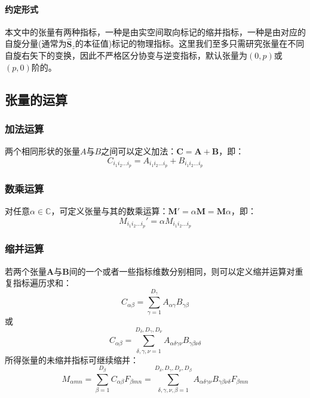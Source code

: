 \paragraph{约定形式}
本文中的张量有两种指标，一种是由实空间取向标记的缩并指标，一种是由对应的自旋分量(通常为$\hat{\symbf{S}}_z$的本征值)标记的物理指标。这里我们至多只需研究张量在不同自旋右矢下的变换，因此不严格区分协变与逆变指标，默认张量为$(0,p)$或$(p,0)$阶的。

\subsection{张量的运算}

\subsubsection{加法运算}

两个相同形状的张量$A$与$B$之间可以定义加法：$\symbf{C} = \symbf{A}+\symbf{B}$，即：
\begin{equation}
C_{i_1 i_2 \dots i_p} = A_{i_1 i_2 \dots i_p} + B_{i_1 i_2 \dots i_p}
\end{equation}


\subsubsection{数乘运算}

对任意$\alpha \in \mathbb{C}$，可定义张量与其的数乘运算：$\symbf{M}' = \alpha \symbf{M} = \symbf{M} \alpha$，即：
\begin{equation}
M_{i_1 i_2 \dots i_p}' = \alpha M_{i_1 i_2 \dots i_p}
\end{equation}

\subsubsection{缩并运算}

若两个张量$\symbf{A}$与$\symbf{B}$间的一个或者一些指标维数分别相同，则可以定义缩并运算对重复指标遍历求和：
\begin{equation}
C_{\alpha\beta} = \sum_{\gamma=1}^{D_\gamma} A_{\alpha\gamma} B_{\gamma\beta}
\end{equation}
或
\begin{equation}
C_{\alpha\beta} = \sum_{\delta,\gamma,\nu=1}^{D_\delta,D_\gamma,D_\nu} A_{\alpha\delta\gamma\nu} B_{\gamma\beta\nu\delta}
\end{equation}
所得张量的未缩并指标可继续缩并：
\begin{equation}
\label{eq.1.5}
M_{\alpha m n} = \sum_{\beta=1}^{D_\beta} C_{\alpha\beta} F_{\beta m n}
	= \sum_{\delta,\gamma,\nu,\beta=1}^{D_\delta,D_\gamma,D_\nu,D_\beta} A_{\alpha\delta\gamma\nu} B_{\gamma\beta\nu\delta} F_{\beta m n}
\end{equation}

